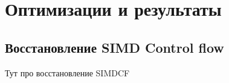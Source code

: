 \chapter{Оптимизации и результаты}\label{ch:results}

\section{Восстановление SIMD Control flow}\label{sec:results/simdcf}

Тут про восстановление SIMDCF

